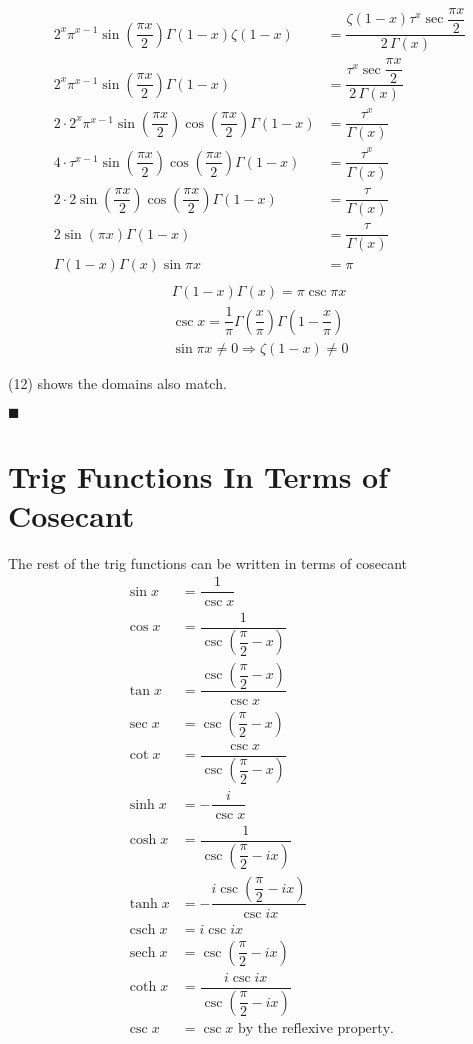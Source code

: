 \documentclass[12pt]{article}
\providecommand \pgrp [1] {\left( #1 \right)}   %
\DeclareMathOperator \csch {csch}
\DeclareMathOperator \sech {sech}
\providecommand \nvpx [1] {\vspace{-#1px}}
\begin{document}
\begin{align*}
	2^x \pi^{x-1} \sin\!\pgrp{\dfrac{\pi x}2} \Gamma(1 - x) \zeta(1 - x) & =
	\dfrac{\zeta(1 - x) \tau^x \sec \dfrac{\pi x}2}{2\,\Gamma(x)}\\
	2^x \pi^{x-1} \sin\!\pgrp{\dfrac{\pi x}2} \Gamma(1 - x) & =
	\dfrac{\tau^x \sec \dfrac{\pi x}2}{2\,\Gamma(x)}\\
	2 \cdot 2^x \pi^{x-1} \sin\!\pgrp{\dfrac{\pi x}2} \cos\!\pgrp{\dfrac{\pi x}2}
		\Gamma(1 - x) & = \dfrac{\tau^x}{\Gamma(x)}\\
	4 \cdot \tau^{x-1} \sin\!\pgrp{\dfrac{\pi x}2} \cos\!\pgrp{\dfrac{\pi x}2}
		\Gamma(1 - x) & = \dfrac{\tau^x}{\Gamma(x)}\\
	2 \cdot 2 \sin\!\pgrp{\dfrac{\pi x}2} \cos\!\pgrp{\dfrac{\pi x}2} \Gamma(1 - x) & =
		\dfrac \tau {\Gamma(x)}\\
	2 \sin\!\pgrp{\pi x} \Gamma(1 - x) & = \dfrac \tau {\Gamma(x)}\\
	\Gamma(1 - x) \Gamma(x) \sin \pi x & = \pi\\
\end{align*}
\nvpx{40}
\begin{align} %
	\Gamma(1 - x) \Gamma(x) = \pi \csc \pi x\\
	\csc x = \dfrac 1\pi \Gamma\!\pgrp{\dfrac x\pi} \Gamma\!\pgrp{1 - \dfrac x\pi}\\
	\sin \pi x \ne 0 \Longrightarrow \zeta(1 - x) \ne 0
\end{align}

\noindent \centerline{(12) shows the domains also match.}

\noindent $\blacksquare$

\pagebreak
\section{Trig Functions In Terms of Cosecant}

\noindent The rest of the trig functions can be written in terms of cosecant\\
\begin{align} %
	\sin x & = \dfrac 1{\csc x}\\
	\cos x & = \dfrac 1{\csc\!\pgrp{\dfrac \pi 2 - x}}\\
	\tan x & = \dfrac {\csc\!\pgrp{\dfrac \pi 2 - x}}{\csc x}\\
	\sec x & = \csc\!\pgrp{\dfrac \pi 2 - x}\\
	\cot x & = \dfrac{\csc x}{\csc\!\pgrp{\dfrac \pi 2 - x}}\\
	\sinh x & = -\dfrac i{\csc x}\\
	\cosh x & = \dfrac 1{\csc\!\pgrp{\dfrac \pi 2 - ix}}\\
	\tanh x & = -\dfrac{i\csc\!\pgrp{\dfrac \pi 2 - ix}}{\csc ix}\\
	\csch x & = i\csc ix\\
	\sech x & = \csc\!\pgrp{\dfrac \pi 2 - ix}\\
	\coth x & =\dfrac{i\csc ix}{\csc\!\pgrp{\dfrac \pi 2 - ix}}\\
	\csc x & = \csc x \text{ by the reflexive property.}
\end{align}
\end{document}
